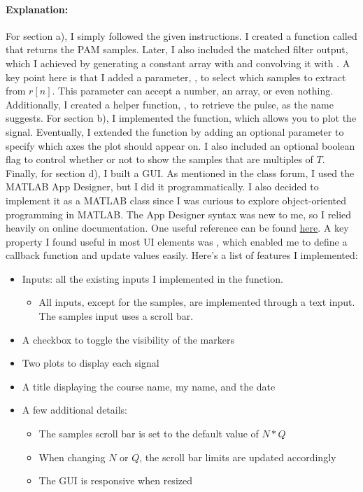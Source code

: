
\paragraph{Explanation:}
For section a), I simply followed the given instructions. I created a
function called  that returns the PAM samples.
Later, I also included the matched filter output, which I achieved by
generating a constant array with  and convolving it with
. A key point here is that I added a parameter,
, to select which samples to extract from $r[n]$. This
parameter can accept a number, an array, or even nothing.
Additionally, I created a helper function,
, to retrieve the pulse, as
the name suggests.
For section b), I implemented the  function,
which allows you to plot the signal. Eventually, I extended the
function by adding an optional parameter to specify which axes the plot should
appear on. I also included an optional boolean flag to control
whether or not to show the samples that are multiples of $T$.
Finally, for section d), I built a GUI. As mentioned in the class
forum, I used the MATLAB App Designer, but I did it programmatically.
I also decided to implement it as a MATLAB class since I was curious
to explore object-oriented programming in MATLAB. The App Designer
syntax was new to me, so I relied heavily on online documentation.
One useful reference can be found
\href{https://www.mathworks.com/help/matlab/creating_guis/add-ui-components-to-app-designer-programmatically.html}{here}.
A key property I found useful in most UI elements was
, which enabled me to define a callback
function and update values easily. Here's a list of features I implemented:
\begin{itemize}
\item Inputs: all the existing inputs I implemented in the
 function.
\begin{itemize}
\item All inputs, except for the samples, are implemented through a
    text input. The samples input uses a scroll bar.
\end{itemize}
\item A checkbox to toggle the visibility of the markers
\item Two plots to display each signal
\item A title displaying the course name, my name, and the date
\item A few additional details:
\begin{itemize}
\item The samples scroll bar is set to the default value of $N*Q$
\item When changing $N$ or $Q$, the scroll bar limits are updated accordingly
\item The GUI is responsive when resized
\end{itemize}
\end{itemize}
